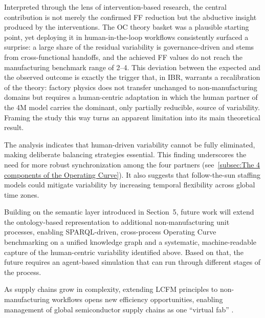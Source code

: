 \documentclass[preprint,12pt,authoryear]{elsarticle}
\begin{document}
Interpreted through the lens of intervention-based research, the central contribution is not merely the confirmed FF reduction but the abductive insight produced by the interventions. The OC theory basket was a plausible starting point, yet deploying it in human-in-the-loop workflows consistently surfaced a surprise: a large share of the residual variability is governance-driven and stems from cross-functional handoffs, and the achieved FF values do not reach the manufacturing benchmark range of 2--4. This deviation between the expected and the observed outcome is exactly the trigger that, in IBR, warrants a recalibration of the theory: factory physics does not transfer unchanged to non-manufacturing domains but requires a human-centric adaptation in which the human partner of the 4M model carries the dominant, only partially reducible, source of variability. Framing the study this way turns an apparent limitation into its main theoretical result.

The analysis indicates that human-driven variability cannot be fully eliminated, making deliberate balancing strategies essential. This finding underscores the need for more robust synchronization among the four partners (see~\ref{subsec:The 4 components of the Operating Curve}). It also suggests that follow-the-sun staffing models could mitigate variability by increasing temporal flexibility across global time zones. 

Building on the semantic layer introduced in Section~5, future work will extend the ontology-based representation to additional non-manufacturing unit processes, enabling SPARQL-driven, cross-process Operating Curve benchmarking on a unified knowledge graph and a systematic, machine-readable capture of the human-centric variability identified above. Based on that, the future requires an agent-based simulation that can run through different stages of the process.

As supply chains grow in complexity, extending LCFM principles to non-manufacturing workflows opens new efficiency opportunities, enabling management of global semiconductor supply chains as one ``virtual fab'' \citep{ehm2011}.





 


    
    
\end{document}
